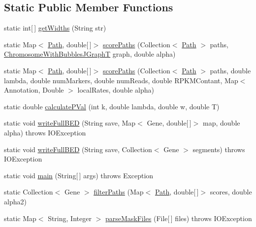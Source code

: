 \subsection*{Static Public Member Functions}
\begin{DoxyCompactItemize}
\item 
static int\mbox{[}$\,$\mbox{]} \hyperlink{classbroad_1_1pda_1_1seq_1_1segmentation_1_1_continuous_data_alignment_model_a87118dfc0d49b68daca8cd351ae3bcab}{get\+Widths} (String str)
\item 
static Map$<$ \hyperlink{classbroad_1_1pda_1_1seq_1_1graph_1_1_path}{Path}, double\mbox{[}$\,$\mbox{]}$>$ \hyperlink{classbroad_1_1pda_1_1seq_1_1segmentation_1_1_continuous_data_alignment_model_a1353042a53391b6ba89d333fdd5fab11}{score\+Paths} (Collection$<$ \hyperlink{classbroad_1_1pda_1_1seq_1_1graph_1_1_path}{Path} $>$ paths, \hyperlink{classbroad_1_1pda_1_1seq_1_1graph_1_1_chromosome_with_bubbles_j_graph_t}{Chromosome\+With\+Bubbles\+J\+Graph\+T} graph, double alpha)
\item 
static Map$<$ \hyperlink{classbroad_1_1pda_1_1seq_1_1graph_1_1_path}{Path}, double\mbox{[}$\,$\mbox{]}$>$ \hyperlink{classbroad_1_1pda_1_1seq_1_1segmentation_1_1_continuous_data_alignment_model_a8c3eca6b8e9d8db29f3e0a8a7f25207b}{score\+Paths} (Collection$<$ \hyperlink{classbroad_1_1pda_1_1seq_1_1graph_1_1_path}{Path} $>$ paths, double lambda, double num\+Markers, double num\+Reads, double R\+P\+K\+M\+Contant, Map$<$ Annotation, Double $>$ local\+Rates, double alpha)
\item 
static double \hyperlink{classbroad_1_1pda_1_1seq_1_1segmentation_1_1_continuous_data_alignment_model_a58a72f78575d4e504c55b46c487d25c7}{calculate\+P\+Val} (int k, double lambda, double w, double T)
\item 
static void \hyperlink{classbroad_1_1pda_1_1seq_1_1segmentation_1_1_continuous_data_alignment_model_ab9f9fcd2fb7cfe1b353af62698759f73}{write\+Full\+B\+E\+D} (String save, Map$<$ Gene, double\mbox{[}$\,$\mbox{]}$>$ map, double alpha)  throws I\+O\+Exception
\item 
static void \hyperlink{classbroad_1_1pda_1_1seq_1_1segmentation_1_1_continuous_data_alignment_model_a2e67d6ebf44bb95cdb4548a6f75d6c4a}{write\+Full\+B\+E\+D} (String save, Collection$<$ Gene $>$ segments)  throws I\+O\+Exception
\item 
static void \hyperlink{classbroad_1_1pda_1_1seq_1_1segmentation_1_1_continuous_data_alignment_model_a8777cdf9066d2f8f1cdd818d9e728d69}{main} (String\mbox{[}$\,$\mbox{]} args)  throws Exception 
\item 
static Collection$<$ Gene $>$ \hyperlink{classbroad_1_1pda_1_1seq_1_1segmentation_1_1_continuous_data_alignment_model_a2fc579cf99a725d9637eaf4891a4fd11}{filter\+Paths} (Map$<$ \hyperlink{classbroad_1_1pda_1_1seq_1_1graph_1_1_path}{Path}, double\mbox{[}$\,$\mbox{]}$>$ scores, double alpha2)
\item 
static Map$<$ String, Integer $>$ \hyperlink{classbroad_1_1pda_1_1seq_1_1segmentation_1_1_continuous_data_alignment_model_a039655b2e536f7a9728f3697c14c4505}{parse\+Mask\+Files} (File\mbox{[}$\,$\mbox{]} files)  throws I\+O\+Exception
\end{DoxyCompactItemize}
